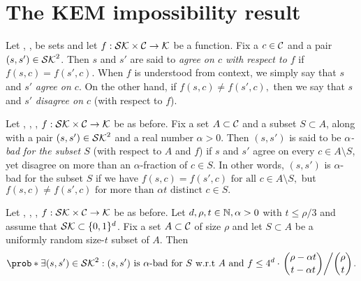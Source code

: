 
\section{The KEM impossibility result}

\begin{definition}\label{def:agree}
  Let \setSK, \setC, \keyspace be sets and
  let \(f : \mathcal{SK} \times \mathcal{C} \to \mathcal{K}\) be a function.
  Fix a \(c \in \mathcal{C}\) and a pair \((s,s') \in \mathcal{SK}^{2}\).
  Then \(s\) and \(s'\) are said to \emph{agree on \(c\) with respect to \(f\)} if
  \(
    f(s,c) = f(s',c).
  \)
  When \(f\) is understood from context, we simply say that \(s\) and \(s'\) \emph{agree on \(c\)}.
  On the other hand, if
  \(
    f(s,c) \ne f(s',c),
  \)
  then we say that \(s\) and \(s'\) \emph{disagree on \(c\)} (with respect to \(f\)).
\end{definition}

\begin{definition}\label{def:bad}
  Let \setSK, \setC, \keyspace, \(f : \mathcal{SK} \times \mathcal{C} \to \mathcal{K}\) be as before.
  Fix a set \(A \subset \mathcal{C}\) and a subset \(S \subset A\),
  along with a pair \((s,s') \in \mathcal{SK}^{2}\) and a real number \(\alpha > 0\).
  Then \((s,s')\) is said to be \emph{\(\alpha\)-bad for the subset \(S\)} (with respect to \(A\) and \(f\)) if
  \(s\) and \(s'\) agree on every \(c \in A \setminus S\), yet disagree on more than an \(\alpha\)-fraction of \(c \in S\).
  In other words, \((s,s')\) is \(\alpha\)-bad for the subset \(S\) if we have
  \(
    f(s,c) = f(s',c) \text{ for all } c \in A \setminus S,
  \)
  but
  \(
    f(s,c) \ne f(s',c) \text{ for more than } \alpha t \text{ distinct } c \in S.
  \)
\end{definition}


\begin{lemma}\label{lemma:equiv}
  Let \setSK, \setC, \keyspace, \(f : \mathcal{SK} \times \mathcal{C} \to \mathcal{K}\) be as before.
  Let \(d,\rho,t \in \mathbb{N}, \alpha > 0\) with \(t \le \rho/3\)
  and assume that \(\mathcal{SK} \subset \{0,1\}^{d}\).
  Fix a set \(A \subset \mathcal{C}\) of size \(\rho\)
  and let \(S \subset A\) be a uniformly random size-\(t\) subset of \(A\).
  Then
  \begin{align}\label{ineq:equiv}
    \prob*{\exists (s,s') \in \setSK^{2} : (s,s') \text{ is \(\alpha\)-bad for } S \text{ w.r.t \(A\) and \(f\)}}
    \le 4^{d} \cdot \left. \binom{\rho - \alpha t}{t - \alpha t} \middle/ \binom{\rho}{t} \right..
  \end{align}
\end{lemma}

